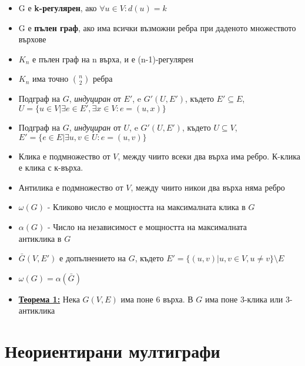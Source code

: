 \documentclass{article}
\begin{document}
\begin{itemize}
    \item[] G е \textbf{k-регулярен}, ако $\forall u\in V: d(u)=k$

    \item[] G е \textbf{пълен граф}, ако има всички възможни ребра при даденото множеството върхове

    \item[] $K_n$ е пълен граф на n върха, и е (n-1)-регулярен

    \item[] $K_n$ има точно $\binom{n}{2}$ ребра

    \item[] Подграф на $G$, \emph{индуциран} от $E'$, e $G'(U, E')$, където $E'\subseteq E$,\\ $U=\{u\in V|\exists e \in E', \exists x \in V:e=(u,x)\}$

    \item[] Подграф на $G$, \emph{индуциран} от $U$, e $G'(U, E')$, където $U\subseteq V$,\\ $E'=\{e\in E|\exists u,v \in U:e=(u,v)\}$

    \item[] Клика е подмножество от $V$, между чиито всеки два върха има ребро. К-клика е клика с к-върха.

    \item[] Антилика е подмножество от $V$, между чиито никои два върха няма ребро

    \item[] $\omega (G)$ - Кликово число е мощността на максималната клика в $G$

    \item[] $\alpha (G)$ - Число на независимост е мощността на максималната \\ антиклика в $G$

    \item[] $\bar{G}(V,E')$ е допълнението на $G$, където $E'=\{(u,v)|u,v\in V, u\neq v\} \setminus E$

    \item[] $\omega (G) = \alpha (\bar{G})$

    \item[] \underline{\textbf{Теорема 1:}} Нека $G(V,E)$ има поне 6 върха. В $G$ има поне 3-клика или 3-антиклика
\end{itemize}

\section{Неориентирани мултиграфи}
\end{document}
